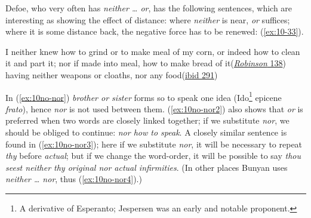Defoe, who very often has \textit{neither {\dots} or}, has the following sentences, which are interesting as showing the effect of distance: where \textit{neither} is near, \textit{or} suffices; where it is some distance back, the negative force has to be renewed: (\ref{ex:10-33}).

\ea \label{ex:10-33}
\ea
I neither knew how to grind or to make meal of my corn, or indeed how to clean it and part it; nor if made into meal, how to make bread of it\hfill(\href{https://archive.org/details/lifeandstranges00dobsgoog/page/n163/mode/2up?q=%22neither+knew+how%22&view=theater}{\textit{Robinson} 138}) 
\ex
having neither weapons or cloaths, nor any food\hfill(\href{https://archive.org/details/lifeandstranges00dobsgoog/page/n317/mode/2up?q=%22neither+weapons%22&view=theater}{ibid 291}) %
\z
\z

In (\ref{ex:10no-nor}) \textit{brother or sister} forms so to speak one idea (Ido\footnote{A derivative of Esperanto; Jespersen was an early and notable proponent. \eds} epicene \textit{frato}), hence \textit{nor} is not used between them. (\ref{ex:10no-nor2}) also shows that \textit{or} is preferred when two words are closely linked together; if we substitute \textit{nor}, we should be obliged to continue: \textit{nor how to speak}. A closely similar sentence is found in (\ref{ex:10no-nor3}); here if we substitute \textit{nor}, it will be necessary to repeat \textit{thy} before \textit{actual}; but if we change the word-order, it will be possible to say \textit{thou seest neither thy original nor actual infirmities}. (In other places Bunyan uses \textit{neither {\dots} nor}, thus (\ref{ex:10no-nor4}).)

